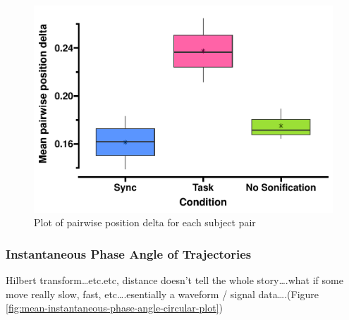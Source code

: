 \documentclass[10pt,a4paper,onecolumn]{article}
\begin{document}
\begin{figure}

{\centering \includegraphics[width=1\linewidth]{CogSci_Bachelor_Thesis_files/figure-latex/pairwise-position-delta-1} 

}

\caption{Plot of pairwise position delta for each subject pair}\label{fig:pairwise-position-delta}
\end{figure}

\hypertarget{instantaneous-phase-angle-of-trajectories}{%
\subsubsection{Instantaneous Phase Angle of Trajectories}\label{instantaneous-phase-angle-of-trajectories}}

Hilbert transform\ldots etc.etc, distance doesn't tell the whole story\ldots.what if some move really slow, fast, etc\ldots.esentially a waveform / signal data\ldots.(Figure \ref{fig:mean-instantaneous-phase-angle-circular-plot})
\end{document}

